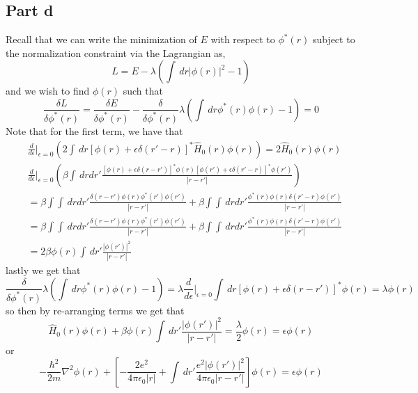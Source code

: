 \documentclass[12pt]{report}
\theoremstyle{custom}
\begin{document}
\subsection*{Part d}
Recall that we can write the minimization of $E$ with respect to $\phi^*(r)$ subject to the normalization constraint via the Lagrangian as,
\begin{equation*}
L = E - \lambda \left(\int \, dr |\phi(r)|^2 - 1\right)
\end{equation*}
and we wish to find $\phi(r)$ such that 
\begin{equation*}
\frac{\delta L}{\delta \phi^*(r)} = \frac{\delta E}{\delta \phi^*(r)} - \frac{\delta}{\delta \phi^*(r)} \lambda \left(\int \, dr \phi^*(r)\phi(r) - 1\right) = 0
\end{equation*}
Note that for the first term, we have that 
\begin{align*}
&\frac{d}{d\epsilon}|_{\epsilon = 0} \left(2\int \, dr [\phi(r) + \epsilon \delta(r' - r)]^* \hat{H}_0(r) \phi(r) \right) =   2 \hat{H}_0(r) \phi(r)\\
&\frac{d}{d\epsilon}|_{\epsilon = 0} \left(\beta \int \, dr dr' \frac{[\phi(r) + \epsilon \delta(r - r')]^*\phi(r)[\phi(r') + \epsilon \delta(r' - r)]^*\phi(r')}{|r - r'|}\right) \\ &=
 \beta \int \int \, drdr' \frac{\delta(r -r')\phi(r)\phi^*(r')\phi(r')}{|r-r'|} + \beta \int \int \, drdr' \frac{\phi^*(r)\phi(r)\delta(r'-r)\phi(r')}{|r-r'|} \\ 
 &= \beta \int \int \, drdr' \frac{\delta(r-r')\phi(r)\phi^*(r')\phi(r')}{|r-r'|} + \beta \int \int \, drdr' \frac{\phi^*(r)\phi(r)\delta(r'-r)\phi(r')}{|r-r'|} \\ 
 &= 2\beta \phi(r) \int \, dr' \frac{|\phi(r')|^2}{|r-r'|}
\end{align*}
lastly we get that
\begin{equation*}
\frac{\delta}{\delta \phi^*(r)} \lambda \left(\int \, dr \phi^*(r)\phi(r) - 1\right) = \lambda \frac{d}{d\epsilon}|_{\epsilon = 0} \int \, dr [\phi(r) + \epsilon\delta(r-r')]^*\phi(r) = \lambda \phi(r)
\end{equation*}
so then by re-arranging terms we get that
\begin{equation*}
      \hat{H}_0(r) \phi(r) + \beta \phi(r) \int \, dr' \frac{|\phi(r')|^2}{|r-r'|} = \frac{\lambda}{2} \phi(r) = \epsilon \phi(r)
\end{equation*}
or
\begin{equation*}
    -\frac{\hbar^2}{2m}\nabla^2\phi(r) + \left[-\frac{2e^2}{4\pi \epsilon_0 |r|} + \int \, dr' \frac{e^2 |\phi(r')|^2}{4\pi \epsilon_0 |r-r'|}\right] \phi(r) = \epsilon \phi(r)
\end{equation*}
\end{document}
